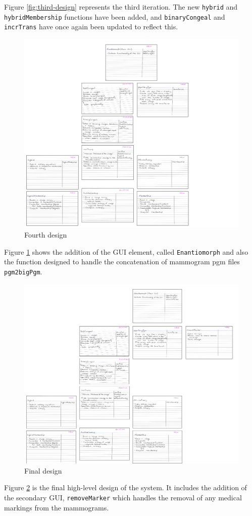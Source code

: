 Figure \ref{fig:third-design} represents the third iteration. The new \texttt{hybrid} and \texttt{hybridMembership} functions have been added, and \texttt{binaryCongeal} and \texttt{incrTrans} have once again been updated to reflect this.

\begin{figure}[H]
  \center
  \includegraphics[scale=0.5]{Appendix4/imgs/fourth.png}
  \caption{Fourth design}
  \label{fig:fourth-design}
\end{figure}

Figure \ref{fig:fourth-design} shows the addition of the \acrshort{GUI} element, called \texttt{Enantiomorph} and also the function designed to handle the concatenation of mammogram pgm files \texttt{pgm2bigPgm}.

\begin{figure}[H]
  \center
  \includegraphics[width = \textwidth]{Appendix4/imgs/final.png}
  \caption{Final design}
  \label{fig:final-design}
\end{figure}

Figure \ref{fig:final-design} is the final high-level design of the system. It includes the addition of the secondary \acrshort{GUI}, \texttt{removeMarker} which handles the removal of any medical markings from the mammograms.
